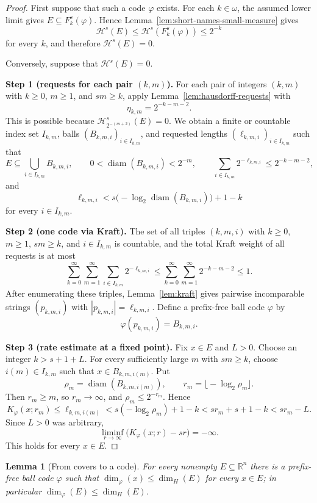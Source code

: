 \documentclass[a4paper,oneside,reqno,12pt]{amsart}
\theoremstyle{plain}
\newtheorem{lemma}[theorem]{Lemma}
\theoremstyle{definition}
\theoremstyle{remark}
\DeclareMathOperator{\diam}{diam}
\begin{document}
\begin{proof}
First suppose that such a code \(\varphi\) exists.  For each \(k\in\omega\),
the assumed lower limit gives \(E\subseteq F_k^s(\varphi)\).  Hence
Lemma~\ref{lem:short-names-small-measure} gives
\[
\mathcal H^s(E)\le\mathcal H^s(F_k^s(\varphi))\le2^{-k}
\]
for every \(k\), and therefore \(\mathcal H^s(E)=0\).

Conversely, suppose that \(\mathcal H^s(E)=0\).

\smallskip
\noindent\textbf{Step 1 (requests for each pair \((k,m)\)).}
For each pair of integers
\((k,m)\) with \(k\ge0\), \(m\ge1\), and \(sm\ge k\), apply
Lemma~\ref{lem:hausdorff-requests} with
\[
\eta_{k,m}=2^{-k-m-2}.
\]
This is possible because \(\mathcal H^s_{2^{-(m+2)}}(E)=0\).  We obtain a finite
or countable index set \(I_{k,m}\), balls \((B_{k,m,i})_{i\in I_{k,m}}\), and
requested lengths \((\ell_{k,m,i})_{i\in I_{k,m}}\) such that
\[
E\subseteq\bigcup_{i\in I_{k,m}}B_{k,m,i},
\qquad
0<\diam(B_{k,m,i})<2^{-m},
\qquad
\sum_{i\in I_{k,m}}2^{-\ell_{k,m,i}}\le2^{-k-m-2},
\]
and
\[
\ell_{k,m,i}<s\bigl(-\log_2\diam(B_{k,m,i})\bigr)+1-k
\]
for every \(i\in I_{k,m}\).

\smallskip
\noindent\textbf{Step 2 (one code via Kraft).}
The set of all triples \((k,m,i)\) with \(k\ge0\), \(m\ge1\), \(sm\ge k\), and
\(i\in I_{k,m}\) is countable, and the total Kraft weight of all requests is at
most
\[
\sum_{k=0}^\infty\sum_{m=1}^\infty
\sum_{i\in I_{k,m}}2^{-\ell_{k,m,i}}
\le
\sum_{k=0}^\infty\sum_{m=1}^\infty 2^{-k-m-2}\le1.
\]
After enumerating these triples, Lemma~\ref{lem:kraft} gives pairwise
incomparable strings \((p_{k,m,i})\) with
\(|p_{k,m,i}|=\ell_{k,m,i}\).  Define a prefix-free ball code \(\varphi\) by
\[
\varphi(p_{k,m,i})=B_{k,m,i}.
\]

\smallskip
\noindent\textbf{Step 3 (rate estimate at a fixed point).}
Fix \(x\in E\) and \(L>0\).  Choose an integer \(k>s+1+L\).  For every
sufficiently large \(m\) with \(sm\ge k\), choose \(i(m)\in I_{k,m}\) such that
\(x\in B_{k,m,i(m)}\).  Put
\[
\rho_m=\diam(B_{k,m,i(m)}),
\qquad
r_m=\bigl\lfloor -\log_2\rho_m\bigr\rfloor .
\]
Then \(r_m\ge m\), so \(r_m\to\infty\), and \(\rho_m\le2^{-r_m}\).  Hence
\[
K_\varphi(x;r_m)
\le \ell_{k,m,i(m)}
< s(-\log_2\rho_m)+1-k
< sr_m+s+1-k
< sr_m-L.
\]
Since \(L>0\) was arbitrary,
\[
\liminf_{r\to\infty}\bigl(K_\varphi(x;r)-sr\bigr)=-\infty.
\]
This holds for every \(x\in E\).
\end{proof}


\begin{lemma}[From covers to a code]
\label{lem:cover-to-code}
For every nonempty \(E\subseteq\mathbb R^n\) there is a prefix-free ball code \(\varphi\)
such that \(\dim_\varphi(x)\le \dim_H(E)\) for every \(x\in E\); in particular
\(\dim_\varphi(E)\le\dim_H(E)\).
\end{lemma}
\end{document}
